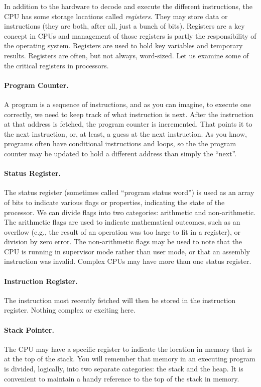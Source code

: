 In addition to the hardware to decode and execute the different instructions, the CPU has some storage locations called \textit{registers}. They may store data or instructions (they are both, after all, just a bunch of bits). Registers are a key concept in CPUs and management of those registers is partly the responsibility of the operating system. Registers are used to hold key variables and temporary results. Registers are often, but not always, word-sized. Let us examine some of the critical registers in processors.

\paragraph{Program Counter.} A program is a sequence of instructions, and as you can imagine, to execute one correctly, we need to keep track of what instruction is next. After the instruction at that address is fetched, the program counter is incremented. That points it to the next instruction, or, at least, a guess at the next instruction. As you know, programs often have conditional instructions and loops, so the the program counter may be updated to hold a different address than simply the ``next''.

\paragraph{Status Register.} The status register (sometimes called ``program status word'') is used as an array of bits to indicate various flags or properties, indicating the state of the processor. We can divide flags into two categories: arithmetic and non-arithmetic. The arithmetic flags are used to indicate mathematical outcomes, such as an overflow (e.g., the result of an operation was too large to fit in a register), or division by zero error. The non-arithmetic flags may be used to note that the CPU is running in supervisor mode rather than user mode, or that an assembly instruction was invalid. Complex CPUs may have more than one status register. 

\paragraph{Instruction Register.} The instruction most recently fetched will then be stored in the instruction register. Nothing complex or exciting here.

\paragraph{Stack Pointer.} The CPU may have a specific register to indicate the location in memory that is at the top of the stack. You will remember that memory in an executing program is divided, logically, into two separate categories: the stack and the heap. It is convenient to maintain a handy reference to the top of the stack in memory.

